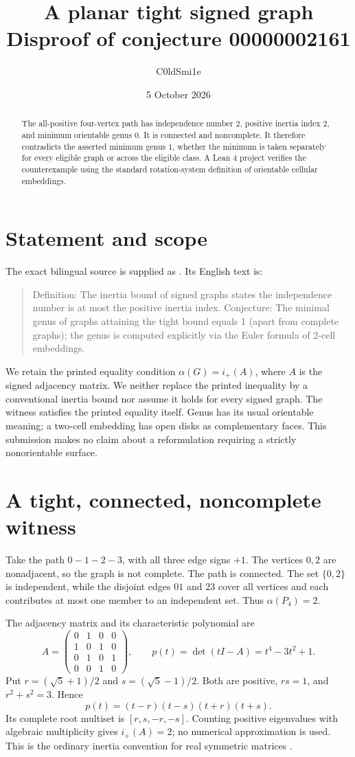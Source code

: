 \documentclass[11pt]{article}
\title{A planar tight signed graph\\\large Disproof of conjecture 00000002161}
\author{C0ldSmi1e}
\date{5 October 2026}
\newcommand{\lean}[1]{\texttt{\detokenize{#1}}}
\newcommand{\ip}{i_{+}}
\begin{document}
\maketitle
\begin{abstract}
The all-positive four-vertex path has independence number $2$, positive
inertia index $2$, and minimum orientable genus $0$. It is connected and
noncomplete. It therefore contradicts the asserted minimum genus $1$,
whether the minimum is taken separately for every eligible graph or across
the eligible class. A Lean 4 project verifies the counterexample using the
standard rotation-system definition of orientable cellular embeddings.
\end{abstract}

\section{Statement and scope}
The exact bilingual source is supplied as \lean{conjecture.md}. Its English
text is:
\begin{quote}\small
Definition: The inertia bound of signed graphs states the independence number
is at most the positive inertia index. Conjecture: The minimal genus of graphs
attaining the tight bound equals 1 (apart from complete graphs); the genus is
computed explicitly via the Euler formula of 2-cell embeddings.
\end{quote}
We retain the printed equality condition $\alpha(G)=\ip(A)$, where $A$ is the
signed adjacency matrix. We neither replace the printed inequality by a
conventional inertia bound nor assume it holds for every signed graph.
The witness satisfies the printed equality itself. Genus has its usual
orientable meaning; a two-cell embedding has open disks as complementary
faces. This submission makes no claim about a reformulation requiring a
strictly nonorientable surface.

\section{A tight, connected, noncomplete witness}
Take the path $0-1-2-3$, with all three edge signs $+1$. The vertices $0,2$
are nonadjacent, so the graph is not complete. The path is connected.
The set $\{0,2\}$ is independent, while the disjoint edges $01$ and $23$
cover all vertices and each contributes at most one member to an independent
set. Thus $\alpha(P_4)=2$.

The adjacency matrix and its characteristic polynomial are
\[
 A=\begin{pmatrix}0&1&0&0\\1&0&1&0\\0&1&0&1\\0&0&1&0\end{pmatrix},
 \qquad p(t)=\det(tI-A)=t^4-3t^2+1.
\]
Put $r=(\sqrt5+1)/2$ and $s=(\sqrt5-1)/2$. Both are positive,
$rs=1$, and $r^2+s^2=3$. Hence
\[
 p(t)=(t-r)(t-s)(t+r)(t+s).
\]
Its complete root multiset is $[r,s,-r,-s]$. Counting positive eigenvalues
with algebraic multiplicity gives $\ip(A)=2$; no numerical approximation is
used. This is the ordinary inertia convention for real symmetric matrices
\cite{inertia}.
\end{document}
